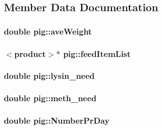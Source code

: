 \subsection{Member Data Documentation}
\hypertarget{classpig_ad0d49e469ffa3c79f23862863ec04735}{
\subsubsection[{aveWeight}]{\setlength{\rightskip}{0pt plus 5cm}double {\bf pig::aveWeight}}}
\label{classpig_ad0d49e469ffa3c79f23862863ec04735}
\hypertarget{classpig_aed511510eabc8fc25f1048f0528b86cf}{
\subsubsection[{feedItemList}]{$<${\bf product}$>$$\ast$ {\bf pig::feedItemList}}}
\label{classpig_aed511510eabc8fc25f1048f0528b86cf}
\hypertarget{classpig_a63e7cb037c0c044934a7fbd10506fb4f}{
\subsubsection[{lysin\_\-need}]{\setlength{\rightskip}{0pt plus 5cm}double {\bf pig::lysin\_\-need}}}
\label{classpig_a63e7cb037c0c044934a7fbd10506fb4f}
\hypertarget{classpig_aaf0ac7abae7bd899541a8d2bc678f663}{
\subsubsection[{meth\_\-need}]{\setlength{\rightskip}{0pt plus 5cm}double {\bf pig::meth\_\-need}}}
\label{classpig_aaf0ac7abae7bd899541a8d2bc678f663}
\hypertarget{classpig_abcbba53abf12eb308dc0222c6d4ce98a}{
\subsubsection[{NumberPrDay}]{\setlength{\rightskip}{0pt plus 5cm}double {\bf pig::NumberPrDay}}}
